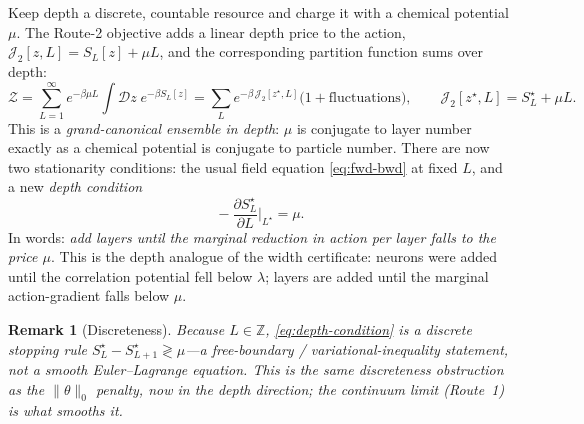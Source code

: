 \documentclass[11pt]{article}
\newtheorem{remark}{Remark}
\theoremstyle{definition}
\newcommand{\J}{\mathcal{J}}
\newcommand{\Dcal}{\mathcal{D}}
\newcommand{\Zpart}{\mathcal{Z}}
\newcommand{\Lstar}{L^{\star}}
\begin{document}
Keep depth a discrete, countable resource and charge it with a chemical potential $\mu$.
The Route-2 objective adds a linear depth price to the action,
$\J_2[z,L]=S_L[z]+\mu L$, and the corresponding partition function sums over depth:
\begin{equation}
\Zpart=\sum_{L=1}^{\infty}e^{-\beta\mu L}\!\int\Dcal z\;e^{-\beta S_L[z]}
=\sum_L e^{-\beta\,\J_2[z^\star,L]}\big(1+\text{fluctuations}\big),
\qquad \J_2[z^\star,L]=S_L^\star+\mu L.
\label{eq:grand-canonical}
\end{equation}
This is a \emph{grand-canonical ensemble in depth}: $\mu$ is conjugate to layer number
exactly as a chemical potential is conjugate to particle number. There are now two
stationarity conditions: the usual field equation \eqref{eq:fwd-bwd} at fixed $L$, and a
new \emph{depth condition}
\begin{equation}
\boxed{\;-\frac{\partial S_L^\star}{\partial L}\bigg|_{\Lstar}=\mu.\;}
\label{eq:depth-condition}
\end{equation}
In words: \emph{add layers until the marginal reduction in action per layer falls to the
price $\mu$}. This is the depth analogue of the width certificate: neurons were added until
the correlation potential fell below $\lambda$; layers are added until the marginal
action-gradient falls below $\mu$.

\begin{remark}[Discreteness]
Because $L\in\mathbb{Z}$, \eqref{eq:depth-condition} is a discrete stopping rule
$S_L^\star-S_{L+1}^\star\gtrless\mu$---a free-boundary / variational-inequality statement,
not a smooth Euler--Lagrange equation. This is the same discreteness obstruction as the
$\|\theta\|_0$ penalty, now in the depth direction; the continuum limit (Route~1) is what
smooths it.
\end{remark}
\end{document}
